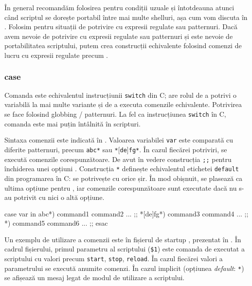 În general recomandăm folosirea  pentru condiții uzuale și întotdeauna atunci când scriptul se dorește portabil între mai multe shelluri, așa cum vom discuta în .
Folosim \cmd{$[[$} pentru situații de potrivire cu expresii regulate sau patternuri.
Dacă avem nevoie de potrivire cu expresii regulate sau patternuri și este nevoie de portabilitatea scriptului, putem crea construcții echivalente folosind comenzi de lucru cu expresii regulate precum .

\subsubsection{case}
\label{sec:auto:script-func:flow-control:case}

Comanda  este echivalentul instrucțiunii \texttt{switch} din C; are rolul de a potrivi o variabilă la mai multe variante și de a executa comenzile echivalente.
Potrivirea se face folosind globbing / patternuri.
La fel ca instrucțiunea \texttt{switch} în C, comanda  este mai puțin întâlnită în scripturi.

Sintaxa comenzii  este indicată în .
Valoarea variabilei \texttt{var} este comparată cu diferite patternuri, precum \texttt{abc*} sau \texttt{*$[$de$]$fg*}.
În cazul fiecărei potriviri, se execută comenzile corespunzătoare.
De avut în vedere construcția \texttt{;;} pentru închiderea unei opțiuni .
Construcția \texttt{*} definește echivalentul etichetei \texttt{default} din programarea în C: se potrivește cu orice șir.
În mod obișnuit, se plasează ca ultima opțiune pentru , iar comenzile corespunzătoare sunt executate dacă nu s-au potrivit cu nici o altă opțiune.

\begin{screen}[caption={Sintaxa comenzii case},label={lst:auto:case-syntax}]
case var in
    abc*)
        command1
        command2
        ...
        ;;
    *[de]fg*)
        command3
        command4
        ...
        ;;
    *)
        command5
        command6
        ...
        ;;
esac
\end{screen}

Un exemplu de utilizare a comenzii  este în fișierul de startup , prezentat în .
În cadrul fișierului, primul parametru al scriptului (\texttt{\$1}) este comanda de executat a scriptului cu valori precum \texttt{start}, \texttt{stop}, \texttt{reload}.
În cazul fiecărei valori a parametrului se execută anumite comenzi.
În cazul implicit (opțiunea \textit{default}: \texttt{*}) se afișează un mesaj legat de modul de utilizare a scriptului.

